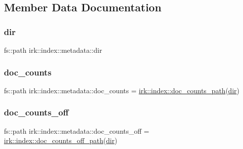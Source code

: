 \subsection{Member Data Documentation}
\mbox{\label{structirk_1_1index_1_1metadata_a355b4325c022cd152e68fc18b1775fc6}} 
\subsubsection{\texorpdfstring{dir}{dir}}
{\footnotesize\ttfamily fs\+::path irk\+::index\+::metadata\+::dir}

\mbox{\label{structirk_1_1index_1_1metadata_a1c98d482a721d75186ef3695d22263ea}} 
\subsubsection{\texorpdfstring{doc\+\_\+counts}{doc\_counts}}
{\footnotesize\ttfamily fs\+::path irk\+::index\+::metadata\+::doc\+\_\+counts = \mbox{\hyperlink{namespaceirk_1_1index_a3af7dfad46ca16b7e1c84fa625779605}{irk\+::index\+::doc\+\_\+counts\+\_\+path}}(\mbox{\hyperlink{structirk_1_1index_1_1metadata_a355b4325c022cd152e68fc18b1775fc6}{dir}})}

\mbox{\label{structirk_1_1index_1_1metadata_a40270e89d8b3b63d01a2c7da3a3e3748}} 
\subsubsection{\texorpdfstring{doc\+\_\+counts\+\_\+off}{doc\_counts\_off}}
{\footnotesize\ttfamily fs\+::path irk\+::index\+::metadata\+::doc\+\_\+counts\+\_\+off = \mbox{\hyperlink{namespaceirk_1_1index_a038babf1f6aece61737ccb3c5984d75e}{irk\+::index\+::doc\+\_\+counts\+\_\+off\+\_\+path}}(\mbox{\hyperlink{structirk_1_1index_1_1metadata_a355b4325c022cd152e68fc18b1775fc6}{dir}})}

